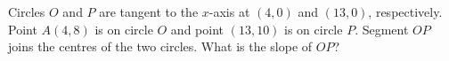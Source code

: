 Circles $O$ and $P$ are tangent to the $x$-axis at $(4,0)$ and $(13,0)$, respectively. Point $A(4,8)$ is on circle $O$ and point $(13,10)$ is on circle $P$. Segment $OP$ joins the centres of the two circles. What is the slope of $OP$?
